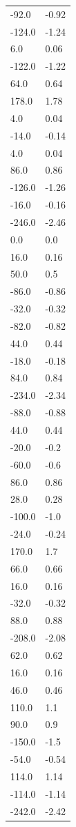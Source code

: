 \begin{longtable}{ll}
-92.0 & -0.92 \\
-124.0 & -1.24 \\
6.0 & 0.06 \\
-122.0 & -1.22 \\
64.0 & 0.64 \\
178.0 & 1.78 \\
4.0 & 0.04 \\
-14.0 & -0.14 \\
4.0 & 0.04 \\
86.0 & 0.86 \\
-126.0 & -1.26 \\
-16.0 & -0.16 \\
-246.0 & -2.46 \\
0.0 & 0.0 \\
16.0 & 0.16 \\
50.0 & 0.5 \\
-86.0 & -0.86 \\
-32.0 & -0.32 \\
-82.0 & -0.82 \\
44.0 & 0.44 \\
-18.0 & -0.18 \\
84.0 & 0.84 \\
-234.0 & -2.34 \\
-88.0 & -0.88 \\
44.0 & 0.44 \\
-20.0 & -0.2 \\
-60.0 & -0.6 \\
86.0 & 0.86 \\
28.0 & 0.28 \\
-100.0 & -1.0 \\
-24.0 & -0.24 \\
170.0 & 1.7 \\
66.0 & 0.66 \\
16.0 & 0.16 \\
-32.0 & -0.32 \\
88.0 & 0.88 \\
-208.0 & -2.08 \\
62.0 & 0.62 \\
16.0 & 0.16 \\
46.0 & 0.46 \\
110.0 & 1.1 \\
90.0 & 0.9 \\
-150.0 & -1.5 \\
-54.0 & -0.54 \\
114.0 & 1.14 \\
-114.0 & -1.14 \\
-242.0 & -2.42 \\

\end{longtable}
